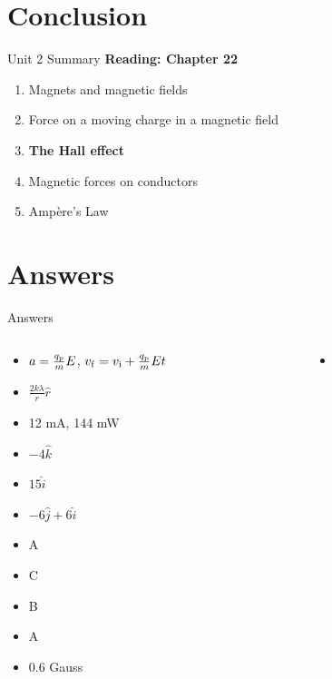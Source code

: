 \documentclass{beamer}
\begin{document}
\section{Conclusion}

\begin{frame}{Unit 2 Summary}
\textbf{Reading: Chapter 22}
\begin{enumerate}
\item Magnets and magnetic fields
\item Force on a moving charge in a magnetic field
\item \textbf{The Hall effect}
\item Magnetic forces on conductors
\item \alert{Amp\`{e}re's Law}
\end{enumerate}
\end{frame}

\section{Answers}

\begin{frame}{Answers}
\tiny
\begin{columns}[T]
\begin{column}{0.5\textwidth}
\begin{itemize}
\item $a = \frac{q_{\rm p}}{m} E$, $v_{\rm f}=v_{\rm i}+\frac{q_{\rm p}}{m} E t$
\item $\frac{2k\lambda}{r} \hat{r}$
\item 12 mA, 144 mW
\item $-4 \hat{k}$
\item $15 \hat{i}$
\item $-6 \hat{j}+6\hat{i}$
\item A
\item C
\item B
\item A
\item 0.6 Gauss
\end{itemize}
\end{column}
\begin{column}{0.5\textwidth}
\begin{itemize}
\item 
\end{itemize}
\end{column}
\end{columns}
\end{frame}
\end{document}
